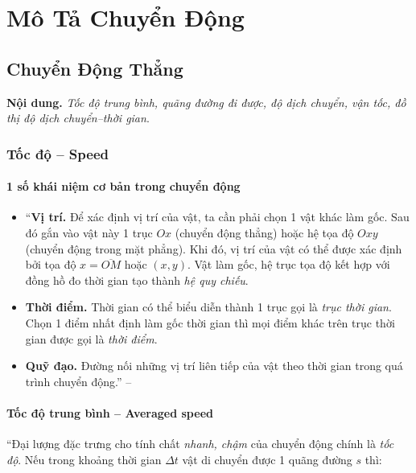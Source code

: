 \documentclass{article}
\numberwithin{equation}{section}
\begin{document}

\section{Mô Tả Chuyển Động}

\subsection{Chuyển Động Thẳng}
\textbf{Nội dung.} \textit{Tốc độ trung bình, quãng đường đi được, độ dịch chuyển, vận tốc, đồ thị độ dịch chuyển--thời gian}.

\subsubsection{Tốc độ -- Speed}

\paragraph{1 số khái niệm cơ bản trong chuyển động}
\begin{itemize}
	\item ``\textbf{Vị trí.} Để xác định vị trí của vật, ta cần phải chọn 1 vật khác làm gốc. Sau đó gắn vào vật này 1 trục $Ox$ (chuyển động thẳng) hoặc hệ tọa độ $Oxy$ (chuyển động trong mặt phẳng). Khi đó, vị trí của vật có thể được xác định bởi tọa độ $x = \overline{OM}$ hoặc $(x,y)$. Vật làm gốc, hệ trục tọa độ kết hợp với đồng hồ đo thời gian tạo thành \textit{hệ quy chiếu}.
	\item \textbf{Thời điểm.} Thời gian có thể biểu diễn thành 1 trục gọi là \textit{trục thời gian}. Chọn 1 điểm nhất định làm gốc thời gian thì mọi điểm khác trên trục thời gian được gọi là \textit{thời điểm}.
	\item \textbf{Quỹ đạo.} Đường nối những vị trí liên tiếp của vật theo thời gian trong quá trình chuyển động.'' -- \cite[pp. 24]{SGK_Vat_Ly_10_Chan_Troi_Sang_Tao}
\end{itemize}

\paragraph{Tốc độ trung bình -- Averaged speed}
``Đại lượng đặc trưng cho tính chất \textit{nhanh, chậm} của chuyển động chính là \textit{tốc độ}. Nếu trong khoảng thời gian $\Delta t$ vật di chuyển được 1 quãng đường $s$ thì:
\end{document}
